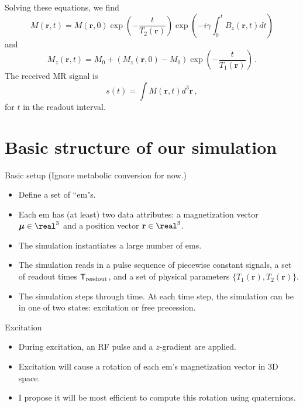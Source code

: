 \documentclass{beamer}
\begin{document}
\begin{frame}
Solving these equations, we find
\begin{equation*}
M(\mathbf{r},t) = M(\mathbf{r},0)\exp\left(-\frac{t}{T_2(\mathbf{r})}\right)\exp\left(-i\gamma \int_{0}^tB_z(\mathbf{r},t)dt\right)
\end{equation*}
and
\begin{equation*}
M_z(\mathbf{r},t) = M_0 + (M_z(\mathbf{r},0) - M_0)\exp\left(-\frac{t}{T_1(\mathbf{r})}\right)\,.
\end{equation*}
The received MR signal is
\begin{equation*}
s(t) = \int M(\mathbf{r},t) d^3\mathbf{r}\,,
\end{equation*}
for $t$ in the readout interval.
\end{frame}

\section{Basic structure of our simulation}

\begin{frame}{Basic setup}
(Ignore metabolic conversion for now.)
\begin{itemize}
\item Define a set of ``em"s.
\item Each em has (at least) two data attributes: a magnetization vector $\boldsymbol{\mu} \in \real^3$ and a position vector $\mathbf{r} \in \real^3$.
\item The simulation instantiates a large number of ems.
\item The simulation reads in a pulse sequence of piecewise constant signals, a set of readout times $\mathsf{T}_{\rm readout}$, and a set of physical parameters $\{T_1(\mathbf{r}), T_2(\mathbf{r})\}$.
\item The simulation steps through time. At each time step, the simulation can be in one of two states: excitation or free precession.
\end{itemize}
\end{frame}

\begin{frame}{Excitation}
\begin{itemize}
\item During excitation, an RF pulse and a $z$-gradient are applied.
\item Excitation will cause a rotation of each em's magnetization vector in 3D space.
\item I propose it will be most efficient to compute this rotation using quaternions.
\end{itemize}
\end{frame}
\end{document}
